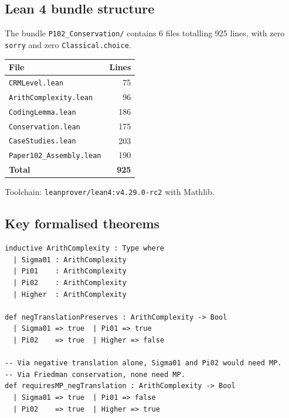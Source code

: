\documentclass[11pt,a4paper]{article}
\theoremstyle{plain}
\theoremstyle{definition}
\begin{document}
\subsection{Lean 4 bundle structure}

The bundle \texttt{P102\_Conservation/} contains 6 files totalling 925 lines, with zero \texttt{sorry} and zero \texttt{Classical.choice}.

\begin{center}
\begin{tabular}{lr}
\toprule
\textbf{File} & \textbf{Lines} \\
\midrule
\texttt{CRMLevel.lean} & 75 \\
\texttt{ArithComplexity.lean} & 96 \\
\texttt{CodingLemma.lean} & 186 \\
\texttt{Conservation.lean} & 175 \\
\texttt{CaseStudies.lean} & 203 \\
\texttt{Paper102\_Assembly.lean} & 190 \\
\midrule
\textbf{Total} & \textbf{925} \\
\bottomrule
\end{tabular}
\end{center}

Toolchain: \texttt{leanprover/lean4:v4.29.0-rc2} with Mathlib.

\subsection{Key formalised theorems}

\begin{tcolorbox}[leanbox={Lean: Arithmetical complexity classification}]
\begin{Verbatim}[fontsize=\small]
inductive ArithComplexity : Type where
  | Sigma01 : ArithComplexity
  | Pi01    : ArithComplexity
  | Pi02    : ArithComplexity
  | Higher  : ArithComplexity

def negTranslationPreserves : ArithComplexity -> Bool
  | Sigma01 => true  | Pi01 => true
  | Pi02    => true  | Higher => false

-- Via negative translation alone, Sigma01 and Pi02 would need MP.
-- Via Friedman conservation, none need MP.
def requiresMP_negTranslation : ArithComplexity -> Bool
  | Sigma01 => true  | Pi01 => false
  | Pi02    => true  | Higher => true
\end{Verbatim}
\end{tcolorbox}
\end{document}
